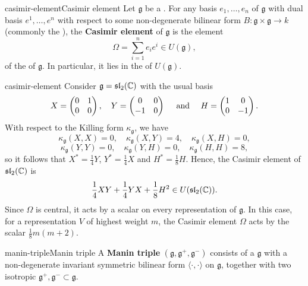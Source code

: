 \begin{topic}{casimir-element}{Casimir element}
    Let $\mathfrak{g}$ be a . For any basis $e_1, \ldots, e_n$ of $\mathfrak{g}$ with dual basis $e^1, \ldots, e^n$ with respect to some non-degenerate bilinear form $B : \mathfrak{g} \times \mathfrak{g} \to k$ (commonly the ), the \textbf{Casimir element} of $\mathfrak{g}$ is the element
    \[ \Omega = \sum_{i = 1}^{n} e_i e^i \in U(\mathfrak{g}) , \]
    of the  of $\mathfrak{g}$. In particular, it lies in the  of $U(\mathfrak{g})$.
\end{topic}

\begin{example}{casimir-element}
    Consider $\mathfrak{g} = \mathfrak{sl}_2(\mathbb{C})$ with the usual basis
    \[ X = \begin{pmatrix} 0 & 1 \\ 0 & 0 \end{pmatrix}, \quad Y = \begin{pmatrix} 0 & 0 \\ -1 & 0 \end{pmatrix} \quad \textup{ and } \quad H = \begin{pmatrix} 1 & 0 \\ 0 & -1 \end{pmatrix} . \]
    With respect to the Killing form $\kappa_\mathfrak{g}$, we have
    \[ \kappa_\mathfrak{g}(X, X) = 0, \quad \kappa_\mathfrak{g}(X, Y) = 4, \quad \kappa_\mathfrak{g}(X, H) = 0, \]
    \[ \kappa_\mathfrak{g}(Y, Y) = 0, \quad \kappa_\mathfrak{g}(Y, H) = 0, \quad \kappa_\mathfrak{g}(H, H) = 8, \]
    so it follows that $X^* = \frac{1}{4} Y$, $Y^* = \frac{1}{4} X$ and $H^* = \frac{1}{8} H$. Hence, the Casimir element of $\mathfrak{sl}_2(\mathbb{C})$ is
    \[ \frac{1}{4} XY + \frac{1}{4} YX + \frac{1}{8} H^2 \in U(\mathfrak{sl}_2(\mathbb{C})) . \]
    Since $\Omega$ is central, it acts by a scalar on every representation of $\mathfrak{g}$. In this case, for a representation $V$ of highest weight $m$, the Casimir element $\Omega$ acts by the scalar $\frac{1}{8} m(m + 2)$.
\end{example}

\begin{topic}{manin-triple}{Manin triple}
    A \textbf{Manin triple} $(\mathfrak{g}, \mathfrak{g}^+, \mathfrak{g}^-)$ consists of a  $\mathfrak{g}$ with a non-degenerate invariant symmetric bilinear form $\langle \cdot, \cdot \rangle$ on $\mathfrak{g}$, together with two isotropic  $\mathfrak{g}^+, \mathfrak{g}^- \subset \mathfrak{g}$.
\end{topic}

